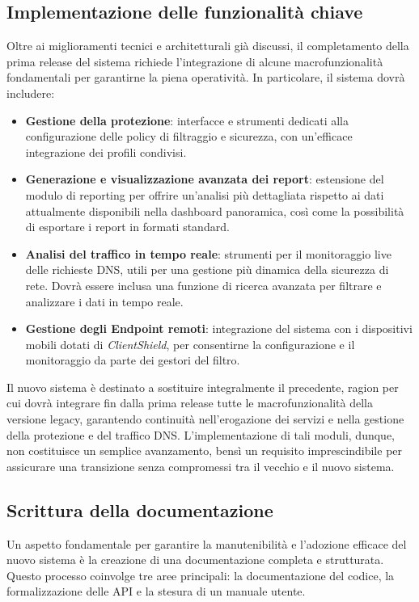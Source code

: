 \subsection{Implementazione delle funzionalità chiave}
Oltre ai miglioramenti tecnici e architetturali già discussi, il completamento della prima release del sistema richiede l’integrazione di alcune macrofunzionalità fondamentali per garantirne la piena operatività. In particolare, il sistema dovrà includere:
\begin{itemize}
  \item \textbf{Gestione della protezione}: interfacce e strumenti dedicati alla configurazione delle policy di filtraggio e sicurezza, con un'efficace integrazione dei profili condivisi.
  \item \textbf{Generazione e visualizzazione avanzata dei report}: estensione del modulo di reporting per offrire un’analisi più dettagliata rispetto ai dati attualmente disponibili nella dashboard panoramica, così come la possibilità di esportare i report in formati standard.
  \item \textbf{Analisi del traffico in tempo reale}: strumenti per il monitoraggio live delle richieste DNS, utili per una gestione più dinamica della sicurezza di rete. Dovrà essere inclusa una funzione di ricerca avanzata per filtrare e analizzare i dati in tempo reale.
  \item \textbf{Gestione degli Endpoint remoti}: integrazione del sistema con i dispositivi mobili dotati di \textit{ClientShield}, per consentirne la configurazione e il monitoraggio da parte dei gestori del filtro.
\end{itemize}

Il nuovo sistema è destinato a sostituire integralmente il precedente, ragion per cui dovrà integrare fin dalla prima release tutte le macrofunzionalità della versione legacy, garantendo continuità nell’erogazione dei servizi e nella gestione della protezione e del traffico DNS. L’implementazione di tali moduli, dunque, non costituisce un semplice avanzamento, bensì un requisito imprescindibile per assicurare una transizione senza compromessi tra il vecchio e il nuovo sistema.

\subsection{Scrittura della documentazione}
Un aspetto fondamentale per garantire la manutenibilità e l’adozione efficace del nuovo sistema è la creazione di una documentazione completa e strutturata. Questo processo coinvolge tre aree principali: la documentazione del codice, la formalizzazione delle API e la stesura di un manuale utente.

